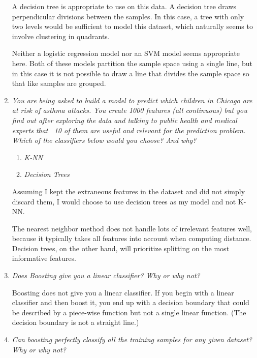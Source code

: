 \documentclass[11pt]{article}
\begin{document}
\begin{enumerate}
        A decision tree is appropriate to use on this data. A decision tree
        draws perpendicular divisions between the samples. In this case, a tree
        with only two levels would be sufficient to model this dataset, which
        naturally seems to involve clustering in quadrants.

        Neither a logistic regression model nor an SVM model seems appropriate
        here. Both of these models partition the sample space using a single
        line, but in this case it is not possible to draw a line that divides
        the sample space so that like samples are grouped.

    \item \textit{You are being asked to build a model to predict which
        children in Chicago are at risk of asthma attacks. You create 1000
        features (all continuous) but you find out after exploring the data and
        talking to public health and medical experts that ~10 of them are
        useful and relevant for the prediction problem. Which of the
        classifiers below would you choose? And why?}

        \begin{enumerate}
            \item \textit{K-NN}
            \item \textit{Decision Trees}
        \end{enumerate}

        Assuming I kept the extraneous features in the dataset and did not
        simply discard them, I would choose to use decision trees as my model
        and not K-NN.

        The nearest neighbor method does not handle lots of irrelevant features
        well, because it typically takes all features into account when
        computing distance. Decision trees, on the other hand, will prioritize
        splitting on the most informative features.

    \item \textit{Does Boosting give you a linear classifier? Why or why not?}

        Boosting does not give you a linear classifier. If you begin with a
        linear classifier and then boost it, you end up with a decision
        boundary that could be described by a piece-wise function but not a
        single linear function. (The decision boundary is not a straight line.)

    \item \textit{Can boosting perfectly classify all the training samples for
        any given dataset? Why or why not?}


\end{enumerate}
\end{document}
